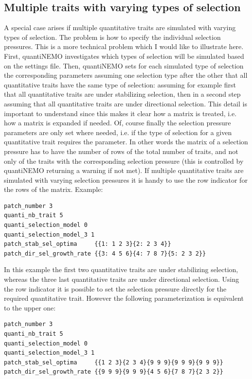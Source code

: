 \documentclass[letterpaper,12pt,oneside]{book}
\begin{document}
\subsection{Multiple traits with varying types of selection}
A special case arises if multiple quantitative traits are simulated with varying types of selection. The problem is how to specify the individual selection pressures. This is a more technical problem which I would like to illustrate here. First, quantiNEMO investigates which types of selection will be simulated based on the settings file. Then, quantiNEMO sets for each simulated type of selection the corresponding parameters assuming one selection type after the other that all quantitative traits have the same type of selection: assuming for example first that all quantitative traits are under stabilizing selection, then in a second step assuming that all quantitative traits are under directional selection. This detail is important to understand since this makes it clear how a matrix is treated, i.e. how a matrix is expanded if needed. Of, course finally the selection pressure parameters are only set where needed, i.e. if the type of selection for a given quantitative trait requires the parameter. In other words the matrix of a selection pressure has to have the number of rows of the total number of traits, and not only of the traits with the corresponding selection pressure (this is controlled by quantiNEMO returning a warning if not met). If multiple quantitative traits are simulated with varying selection pressures it is handy to use the row indicator for the rows of the matrix. Example:
\begin{lstlisting}[frame=single]
patch_number 3
quanti_nb_trait 5 
quanti_selection_model 0	
quanti_selection_model_3 1
patch_stab_sel_optima     {{1: 1 2 3}{2: 2 3 4}}
patch_dir_sel_growth_rate {{3: 4 5 6}{4: 7 8 7}{5: 2 3 2}}
\end{lstlisting}
In this example the first two quantitative traits are under stabilizing selection, whereas the three last quantitative traits are under directional selection. Using the row indicator it is possible to set the selection pressure directly for the required quantitative trait. However the following parameterization is equivalent to the upper one:
\begin{lstlisting}[frame=single]
patch_number 3
quanti_nb_trait 5 
quanti_selection_model 0	
quanti_selection_model_3 1
patch_stab_sel_optima     {{1 2 3}{2 3 4}{9 9 9}{9 9 9}{9 9 9}}
patch_dir_sel_growth_rate {{9 9 9}{9 9 9}{4 5 6}{7 8 7}{2 3 2}}
\end{lstlisting}
\end{document}
